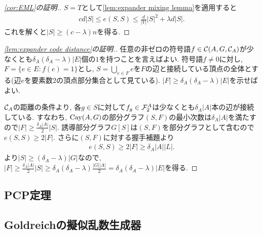 \begin{proof}[\cref{cor:EML}の証明.]
    $S=T$として\cref{lem:expander mixing lemma}を適用すると
    \begin{align*}
        cd|S| \leq e(S,S) \leq \frac{d}{|V|}|S|^2+\lambda d |S|.
    \end{align*}
    これを解くと$|S|\geq (c-\lambda)n$を得る.
\end{proof}
%
\begin{proof}[\cref{lem:expander code distance}の証明.]
    任意の非ゼロの符号語$f\in\mathcal{C}(A,G,\mathcal{C}_A)$が少なくとも$\delta_A(\delta_A-\lambda)|E|$個の$1$を持つことを言えばよい.
    符号語$f\neq 0$に対し, $F=\{e\in E\colon f(e)=1\}$とし, $S=\bigcup_{e\in F}e$を$F$の辺と接続している頂点の全体とする(辺$e$を要素数$2$の頂点部分集合として見ている).
    $|F|\geq\delta_A(\delta_A-\lambda)|E|$を示せばよい.

    $\mathcal{C}_A$の距離の条件より,
    各$g\in S$に対して$f_g\in\mathcal{F}_2^A$は少なくとも$\delta_A|A|$本の辺が接続している.
    すなわち, $\mathrm{Cay}(A,G)$の部分グラフ$(S,F)$の最小次数は$\delta_A|A|$を満たすので$|F|\geq \frac{\delta_A |A|}{2}|S|$.
    誘導部分グラフ$G[S]$は$(S,F)$を部分グラフとして含むので$e(S,S)\geq 2|F|$.
    さらに$(S,F)$に対する握手補題より
    \begin{align*}
        e(S,S)\geq 2|F|\geq \delta_A|A||L|.
    \end{align*}
%
    より$|S|\geq (\delta_A-\lambda)|G|$なので,
    $|F|\geq \frac{\delta_A|A|}{2}|S|\geq \delta_A(\delta_A-\lambda)\frac{|G||A|}{2}=\delta_A(\delta_A-\lambda)|E|$を得る.
\end{proof}



\subsection{PCP定理}

\subsection{Goldreichの擬似乱数生成器}

